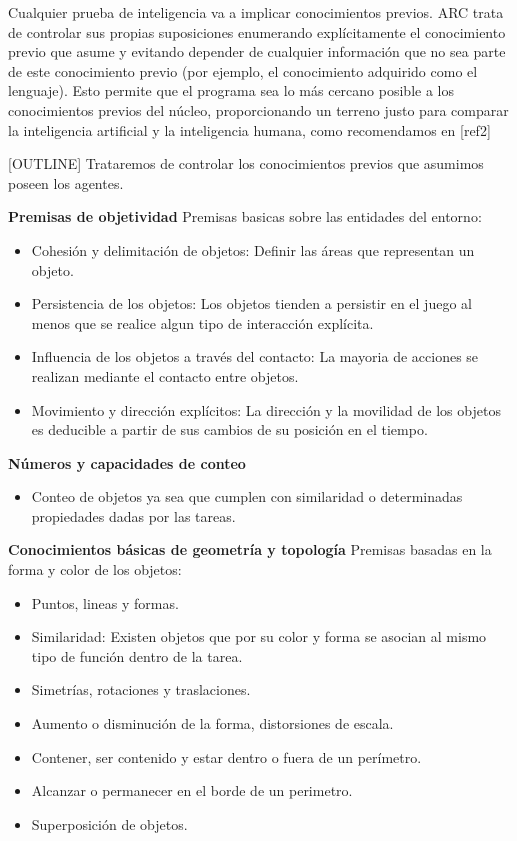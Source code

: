 Cualquier prueba de inteligencia va a implicar conocimientos previos. ARC trata de controlar sus propias suposiciones enumerando explícitamente el conocimiento previo que asume y evitando depender de cualquier información que no sea parte de este conocimiento previo (por ejemplo, el conocimiento adquirido como el lenguaje). Esto permite que el programa sea lo más cercano posible a los conocimientos previos del núcleo, proporcionando un terreno justo para comparar la inteligencia artificial y la inteligencia humana, como recomendamos en [ref2]

[OUTLINE] Trataremos de controlar los conocimientos previos que asumimos poseen los agentes.

\textbf{Premisas de objetividad}
Premisas basicas sobre las entidades del entorno:
\begin{itemize}
\item Cohesión y delimitación de objetos: Definir las áreas que representan un objeto.
\item Persistencia de los objetos: Los objetos tienden a persistir en el juego al menos que se realice algun tipo de interacción explícita.
\item Influencia de los objetos a través del contacto: La mayoria de acciones se realizan mediante el contacto entre objetos.
\item Movimiento y dirección explícitos: La dirección y la movilidad de los objetos es deducible a partir de sus cambios de su posición en el tiempo.
\end{itemize}

\textbf{Números y capacidades de conteo}
\begin{itemize}
    \item Conteo de objetos ya sea que cumplen con similaridad o determinadas propiedades dadas por las tareas.
\end{itemize}

\textbf{Conocimientos básicas de geometría y topología}
Premisas basadas en la forma y color de los objetos:
\begin{itemize}
\item Puntos, lineas y formas.
\item Similaridad: Existen objetos que por su color y forma se asocian al mismo tipo de función dentro de la tarea.
\item Simetrías, rotaciones y traslaciones.
\item Aumento o disminución de la forma, distorsiones de escala.
\item Contener, ser contenido y estar dentro o fuera de un perímetro.
\item Alcanzar o permanecer en el borde de un perimetro.
\item Superposición de objetos.
\end{itemize}

